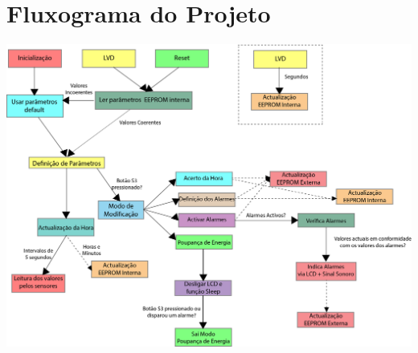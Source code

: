 \documentclass{article}
\begin{document}
		\section{Fluxograma do Projeto}
		\begin{center}
			\includegraphics[width=1\textwidth]{scemaqestados}
		\end{center}
		
	
\end{document}
